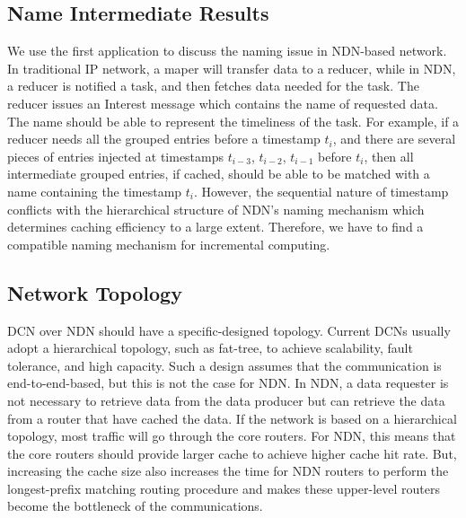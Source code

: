 \documentclass[journal]{IEEEtran}
\begin{document}
\subsection{Name Intermediate Results}
We use the first application to discuss the naming issue in NDN-based network.
In traditional IP network, a maper will transfer data to a reducer, while in
NDN, a reducer is notified a task, and then fetches data needed for the task.
The reducer issues an {\sc Interest} message which contains the name of
requested data.  The name should be able to represent the timeliness of the
task.  For example, if a reducer needs all the grouped entries before a
timestamp $t_i$, and there are several pieces of entries injected at timestamps
$t_{i-3}$, $t_{i-2}$, $t_{i-1}$ before $t_i$, then all intermediate grouped
entries, if cached, should be able to be matched with a name containing the
timestamp $t_i$.  However, the sequential nature of timestamp conflicts with the
hierarchical structure of NDN's naming mechanism which determines caching
efficiency to a large extent. Therefore, we have to find a compatible naming
mechanism for incremental computing.

\subsection{Network Topology}
DCN over NDN should have a specific-designed topology. Current DCNs usually adopt
a hierarchical topology, such as fat-tree, to achieve scalability, fault tolerance,
and high capacity. Such a design assumes that the communication is end-to-end-based, 
but this is not the case for NDN. In NDN, a data requester is not necessary to 
retrieve data from the data producer but can retrieve the data from a router that 
have cached the data. If the network is based on a hierarchical topology, most traffic
will go through the core routers. For NDN, this means that the core routers should provide
larger cache to achieve higher cache hit rate. But, increasing the cache size also increases
the time for NDN routers to perform the longest-prefix matching routing procedure and makes
these upper-level routers become the bottleneck of the communications.
\end{document}
